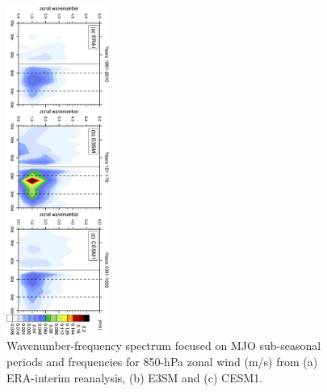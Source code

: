 \documentclass[draft,ms]{AGUTeX}
\begin{document}
\begin{article}
\begin{figure}[t]
  \begin{center}
    \noindent\includegraphics[width=0.3\textwidth,angle=90.]{./figs/f_mjo_spectra_U850_djf.pdf}
  \end{center}
  \caption{Wavenumber-frequency spectrum focused on MJO sub-seasonal periods and frequencies for 850-hPa zonal wind (m/s) from (a) ERA-interim reanalysis, (b) E3SM and (c) CESM1.} 
\label{f_mjo_spectra_U850_djf}
\end{figure}


\end{article}
\end{document}
